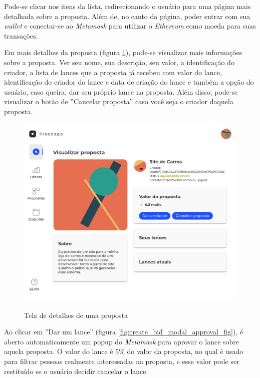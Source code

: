 Pode-se clicar nos itens da lista, redirecionando o usuário para uma página mais detalhada sobre a proposta. Além de, no canto da página, poder entrar com sua \textit{wallet} e conectar-se ao \textit{Metamask} para utilizar o \textit{Ethereum} como moeda para suas transações.

Em mais detalhes da proposta (figura \ref{fig:proposal_detail_page_state_waiting_bid_fig}), pode-se visualizar mais informações sobre a proposta. Ver seu nome, sua descrição, seu valor, a identificação do criador, a lista de lances que a proposta já recebeu com valor do lance, identificação do criador do lance e data de criação do lance e também a opção do usuário, caso queira, dar seu próprio lance na proposta. Além disso, pode-se visualizar o botão de ''Cancelar proposta'' caso você seja o criador daquela proposta.

\begin{figure}[h!]
  \centering
  \caption{Tela de detalhes de uma proposta}
  \includegraphics[width=450px]{src/images/app/proposal_detail_page_state_waiting_bid.png}
  \label{fig:proposal_detail_page_state_waiting_bid_fig}
\end{figure}

Ao clicar em ''Dar um lance'' (figura \ref{fig:create_bid_modal_approval_fig}), é aberto automaticamente um popup do \textit{Metamask} para aprovar o lance sobre aquela proposta. O valor do lance é 5\% do valor da proposta, no qual é usado para filtrar pessoas realmente interessadas na proposta, e esse valor pode ser restituído se o usuário decidir cancelar o lance.

